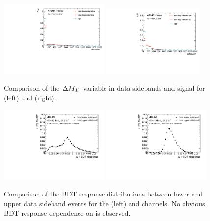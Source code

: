 \begin{figure}[htbp]
  \centering
 \includegraphics[width=0.48\textwidth]{figures/VBF/deltaMJJ_2cen.pdf}
 \includegraphics[width=0.45\textwidth]{figures/VBF/deltaMJJ_4cen.pdf}
\caption{Comparison of the $\Delta M_{\rm JJ}$ variable in data sidebands and signal for \twocentral (left) and \fourcentral (right). }
  \label{fig:vbf-deltaMjj}
\end{figure}


\begin{figure}[htbp]
  \centering
 \includegraphics[width=0.48\textwidth]{figures/VBF/VBF_BDT_sidebands_2cen.pdf}
 \includegraphics[width=0.48\textwidth]{figures/VBF/VBF_BDT_sidebands_4cen.pdf}
\caption{Comparison of the BDT response distributions between lower and upper data sideband events for the \twocentral (left) and \fourcentral channels. No obvious BDT response dependence on \Mbb is observed. }
  \label{fig:vbf-bdtsidebands}
\end{figure}



